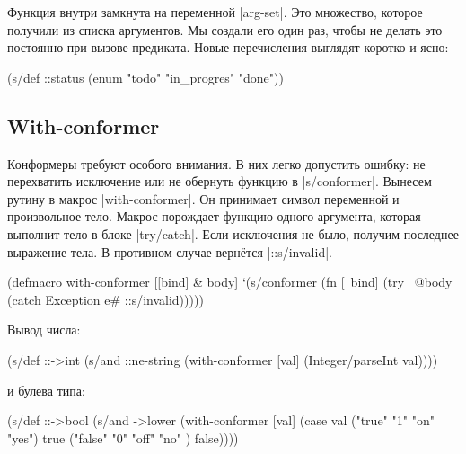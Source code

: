 Функция внутри замкнута на переменной \spverb|arg-set|. Это множество, которое
получили из списка аргументов. Мы создали его один раз, чтобы не делать это
постоянно при вызове предиката. Новые перечисления выглядят коротко и ясно:

\begin{english}
  \begin{clojure}
(s/def ::status
  (enum "todo" "in_progres" "done"))
  \end{clojure}
\end{english}

\subsection{With-conformer}


Конформеры требуют особого внимания. В них легко допустить ошибку: не
перехватить исключение или не обернуть функцию в \spverb|s/conformer|. Вынесем
рутину в макрос \spverb|with-conformer|. Он принимает символ переменной и
произвольное тело. Макрос порождает функцию одного аргумента, которая выполнит
тело в блоке \spverb|try/catch|. Если исключения не было, получим последнее
выражение тела. В противном случае верн\"{е}тся \spverb|::s/invalid|.

\begin{english}
  \begin{clojure}
(defmacro with-conformer
  [[bind] & body]
  `(s/conformer
    (fn [~bind]
      (try
        ~@body
        (catch Exception e#
          ::s/invalid)))))
  \end{clojure}
\end{english}

\noindent
Вывод числа:

\begin{english}
  \begin{clojure}
(s/def ::->int
  (s/and
   ::ne-string
   (with-conformer [val]
     (Integer/parseInt val))))
  \end{clojure}
\end{english}

\noindent
и булева типа:

\begin{english}
  \begin{clojure}
(s/def ::->bool
  (s/and
   ->lower
   (with-conformer [val]
     (case val
       ("true"  "1" "on"  "yes") true
       ("false" "0" "off" "no" ) false))))
  \end{clojure}
\end{english}

